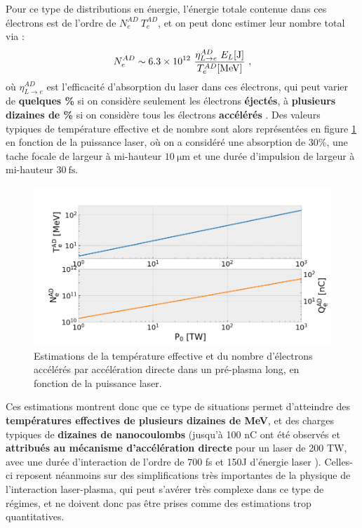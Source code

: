 \begin{refsection}
Pour ce type de distributions en énergie, l'énergie totale contenue dans ces électrons est de l'ordre de $N_e^{AD} ~ T_e^{AD}$, et on peut donc estimer leur nombre total via :
\begin{equation}
    N_e^{AD} \sim 6.3 \times 10^{12} ~ \dfrac{\eta_{L \to e}^{AD} ~ E_L \si{[J]}}{T_e^{AD} \si{[MeV]}} ~ \rm ,
    \label{eq:2-acceleration_directe_nombre}
\end{equation}
où $\eta_{L \to e}^{AD}$ est l'efficacité d'absorption du laser dans ces électrons, qui peut varier de \textbf{quelques \%} si on considère seulement les électrons \textbf{éjectés}, à \textbf{plusieurs dizaines de \%} si on considère tous les électrons \textbf{accélérés} \parencite{pukhov_1999}. Des valeurs typiques de température effective et de nombre sont alors représentées en figure \ref{fig:2-scaling_acceleration_directe} en fonction de la puissance laser, où on a considéré une absorption de 30\%, une tache focale de largeur à mi-hauteur $10 ~ \si{\um}$ et une durée d'impulsion de largeur à mi-hauteur $30 ~ \si{\fs}$.

\begin{figure}[hbtp]
    \centering
    \includegraphics[width=0.7\linewidth]{2-laser/scaling_Pukhov.png}
    \caption{Estimations de la température effective et du nombre d'électrons accélérés par accélération directe dans un pré-plasma long, en fonction de la puissance laser.}
    \label{fig:2-scaling_acceleration_directe}
\end{figure}

Ces estimations montrent donc que ce type de situations permet d'atteindre des \textbf{températures effectives de plusieurs dizaines de MeV}, et des charges typiques de \textbf{dizaines de nanocoulombs} (jusqu'à 100 nC ont été observés et \textbf{attribués au mécanisme d'accélération directe} pour un laser de 200 TW, avec une durée d'interaction de l'ordre de 700 fs et 150J d'énergie laser \parencite{ma_2018}). Celles-ci reposent néanmoins sur des simplifications très importantes de la physique de l'interaction laser-plasma, qui peut s'avérer très complexe dans ce type de régimes, et ne doivent donc pas être prises comme des estimations trop quantitatives.


\end{refsection}
